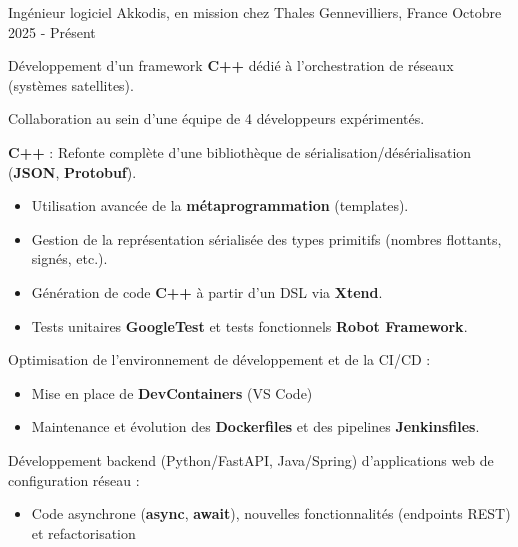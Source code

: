 

\begin{cventries}
	\cventry
	{Ingénieur logiciel} %
	{Akkodis, en mission chez Thales} %
	{Gennevilliers, France} %
	{Octobre 2025 - Présent} %
	{
		\begin{cvitems} %
		\item{
			Développement d'un framework \textbf{C++} dédié à l'orchestration de réseaux (systèmes satellites).
		}
		\item{
			Collaboration au sein d'une équipe de 4 développeurs expérimentés.
		}
		\item{
			\textbf{C++} : Refonte complète d'une bibliothèque de sérialisation/désérialisation (\textbf{JSON}, \textbf{Protobuf}).
			\begin{itemize}
				\item{Utilisation avancée de la \textbf{métaprogrammation} (templates).}
				\item{Gestion de la représentation sérialisée des types primitifs (nombres flottants, signés, etc.).}
				\item{Génération de code \textbf{C++} à partir d'un DSL via \textbf{Xtend}.}
				\item{Tests unitaires \textbf{GoogleTest} et tests fonctionnels \textbf{Robot Framework}.}
			\end{itemize}
		}
		\item{
			Optimisation de l'environnement de développement et de la CI/CD :
			\begin{itemize}
				\item{Mise en place de \textbf{DevContainers} (VS Code)}
				\item{Maintenance et évolution des \textbf{Dockerfiles} et des pipelines \textbf{Jenkinsfiles}.}
			\end{itemize}
		}
		\item Développement backend (Python/FastAPI, Java/Spring) d'applications web de configuration réseau :
			\begin{itemize}
 				\item Code asynchrone (\textbf{async}, \textbf{await}), nouvelles fonctionnalités (endpoints REST) et refactorisation

\end{itemize}
\end{cvitems}}
\end{cventries}
